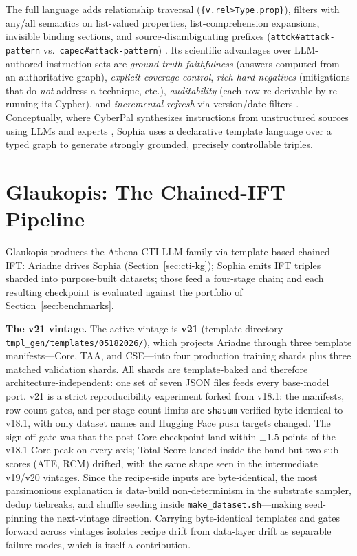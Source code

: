 \documentclass[conference]{IEEEtran}
\providecommand{\hfid}[1]{{\small\nolinkurl{#1}}}
\begin{document}
\noindent The full language adds relationship traversal (\verb|{v.rel>Type.prop}|), filters with any/all semantics on list-valued properties, list-comprehension expansions, invisible binding sections, and source-disambiguating prefixes (\verb|attck#attack-pattern| vs.\ \verb|capec#attack-pattern|) \cite{cardei2025ift}. Its scientific advantages over LLM-authored instruction sets are \emph{ground-truth faithfulness} (answers computed from an authoritative graph), \emph{explicit coverage control}, \emph{rich hard negatives} (mitigations that do \emph{not} address a technique, etc.), \emph{auditability} (each row re-derivable by re-running its Cypher), and \emph{incremental refresh} via version/date filters \cite{cardei2025ift,alam2025athenabench}. Conceptually, where CyberPal synthesizes instructions from unstructured sources using LLMs and experts \cite{levi2024cyberpal,levi2025toward}, Sophia uses a declarative template language over a typed graph to generate strongly grounded, precisely controllable triples.

\section{Glaukopis: The Chained-IFT Pipeline}
\label{sec:glaukopis}

Glaukopis produces the Athena-CTI-LLM family via template-based chained IFT: Ariadne drives Sophia (Section~\ref{sec:cti-kg}); Sophia emits IFT triples sharded into purpose-built datasets; those feed a four-stage chain; and each resulting checkpoint is evaluated against the portfolio of Section~\ref{sec:benchmarks}.

\textbf{The v21 vintage.} The active vintage is \textbf{v21} (template directory \hfid{tmpl_gen/templates/05182026/}), which projects Ariadne through three template manifests---Core, TAA, and CSE---into four production training shards plus three matched validation shards. All shards are template-baked and therefore architecture-independent: one set of seven JSON files feeds every base-model port. v21 is a strict reproducibility experiment forked from v18.1: the manifests, row-count gates, and per-stage count limits are \texttt{shasum}-verified byte-identical to v18.1, with only dataset names and Hugging Face push targets changed. The sign-off gate was that the post-Core checkpoint land within $\pm1.5$ points of the v18.1 Core peak on every axis; Total Score landed inside the band but two sub-scores (ATE, RCM) drifted, with the same shape seen in the intermediate v19/v20 vintages. Since the recipe-side inputs are byte-identical, the most parsimonious explanation is data-build non-determinism in the substrate sampler, dedup tiebreaks, and shuffle seeding inside \hfid{make_dataset.sh}---making seed-pinning the next-vintage direction. Carrying byte-identical templates and gates forward across vintages isolates recipe drift from data-layer drift as separable failure modes, which is itself a contribution.
\end{document}
